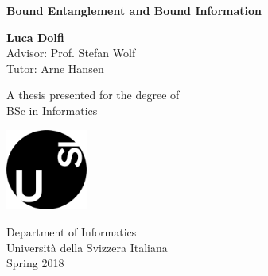\begin{titlepage}
    \begin{center}
        \vspace*{1cm}
        
        \Huge
        \textbf{Bound Entanglement and Bound Information}
        
        \vspace{0.5cm}
        \LARGE
        
        \vspace{1.5cm}
        
        \textbf{Luca Dolfi}\\ 
         Advisor: Prof. Stefan Wolf \\ 
         Tutor: Arne Hansen \\
        
        \vfill
        
        A thesis presented for the degree of\\
        BSc in Informatics
        
        \vspace{0.8cm}
        
        \includegraphics[width=0.2\textwidth]{images/usi-immagini-logo-formatted.png}
        
        \Large
        Department of Informatics\\
        Universit\`a della Svizzera Italiana\\
        Spring 2018
        
    \end{center}
\end{titlepage}